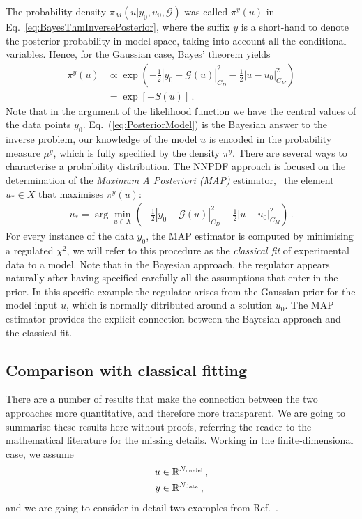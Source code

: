 The probability density $\pi_M(u|y_0,u_0,\mathcal{G})$ was called $\pi^y(u)$ in
Eq.~\ref{eq:BayesThmInversePosterior}, where the suffix $y$ is a short-hand to
denote the posterior probability in model space, taking into account all the
conditional variables. Hence, for the Gaussian case, Bayes' theorem yields
\begin{align}
  \label{eq:PosteriorModel}
  \pi^y(u) &\propto 
  \exp\left(
  -\frac12 \left| y_0 - \mathcal G(u) \right|_{C_D}^2
  -\frac12 \left| u - u_0 \right|_{C_M}^2
  \right)\\ 
  &= \exp\left[
    - S(u)
  \right]\, .
\end{align}
Note that in the argument of the likelihood function we have the central values
of the data points $y_0$. Eq.~(\ref{eq:PosteriorModel}) is the Bayesian answer
to the inverse problem, our knowledge of the model $u$ is encoded in the
probability measure $\mu^y$, which is fully specified by the density $\pi^y$.
There are several ways to characterise a probability distribution. The NNPDF
approach is focused on the determination of the {\em Maximum A Posteriori (MAP)}
estimator, \ie\ the element $u_* \in X$ that maximises $\pi^y(u)$:
\begin{align}\label{eq:MAP}
  u_* = \arg\min_{u \in X} 
  \left(
  -\frac12 \left| y_0 - \mathcal G(u) \right|_{C_D}^2
  -\frac12 \left| u - u_0 \right|_{C_M}^2
  \right)\, .
\end{align}
For every instance of the data $y_0$, the MAP estimator is computed by
minimising a regulated $\chi^2$, we will refer to this procedure as the {\em
classical fit} of experimental data to a model. Note that in the Bayesian
approach, the regulator appears naturally after having specified carefully all
the assumptions that enter in the prior. In this specific example the regulator
arises from the Gaussian prior for the model input $u$, which is normally
ditributed around a solution $u_0$. The MAP estimator provides the explicit
connection between the Bayesian approach and the classical fit.

\subsection{Comparison with classical fitting}
\label{sec:comp-class-fit}

There are a number of results that make the connection between the two
approaches more quantitative, and therefore more transparent. We are
going to summarise these results here without proofs, referring the
reader to the mathematical literature for the missing details. Working
in the finite-dimensional case, we assume 
\begin{align*}
  u &\in \mathbb{R}^{N_{\rm model}} \, ,\\
  y &\in \mathbb{R}^{N_{\rm data}}\, ,
\end{align*}
and we are going to consider in detail two examples from Ref.~\cite{StuartCore}.

